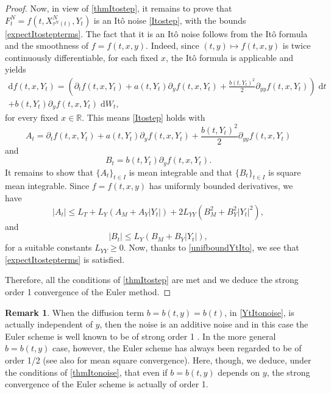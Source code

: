 \documentclass[reqno,12pt]{amsart}
\theoremstyle{plain}%
\theoremstyle{definition}
\newtheorem{rmk}{Remark}[section]
\begin{document}
\begin{proof}
    Now, in view of \cref{thmItostep}, it remains to prove that $F_t^N = f(t, X_{\tau^N(t)}^N, Y_t)$ is an It\^o noise  \eqref{Itostep}, with the bounds \eqref{expectItostepterms}. The fact that it is an It\^o noise follows from the It\^o formula and the smoothness of $f=f(t, x, y)$. Indeed, since $(t, y) \mapsto f(t, x, y)$ is twice continuously differentiable, for each fixed $x$, the It\^o formula is applicable and yields
    \begin{multline}
        \label{itoformula}
            \mathrm{d}f(t, x, Y_t) = \left(\partial_t f(t, x, Y_t) + a(t, Y_t) \partial_y f(t, x, Y_t)  + \frac{b(t, Y_t)^2}{2}\partial_{yy}f(t, x, Y_t) \right) \;\mathrm{d}t \\ + b(t, Y_t) \partial_y f(t, x, Y_t)\;\mathrm{d}W_t,
        \end{multline}
    for every fixed $x\in \mathbb{R}$. This means \eqref{Itostep} holds with
    \[
        A_t = \partial_t f(t, x, Y_t) + a(t, Y_t) \partial_y f(t, x, Y_t)  + \frac{b(t, Y_t)^2}{2}\partial_{yy}f(t, x, Y_t)
    \]
    and
    \[
        B_t = b(t, Y_t) \partial_y f(t, x, Y_t).
    \]
    It remains to show that $\{A_t\}_{t\in I}$ is mean integrable and that $\{B_t\}_{t\in I}$ is square mean integrable. Since $f=f(t, x, y)$ has uniformly bounded derivatives, we have
    \[
        |A_t| \leq L_T + L_Y(A_M + A_Y|Y_t|) + 2L_{YY}(B_M^2 + B_Y^2|Y_t|^2),
    \]
    and
    \[
        |B_t| \leq L_Y (B_M + B_Y |Y_t|),
    \]
    for a suitable constants $L_{YY}\geq 0$. Now, thanks to \eqref{unifboundYtIto}, we see that \eqref{expectItostepterms} is satisfied.

    Therefore, all the conditions of \cref{thmItostep} are met and we deduce the strong order 1 convergence of the Euler method.
\end{proof}

\begin{rmk}
    When the diffusion term $b = b(t, y) = b(t)$, in \eqref{YtItonoise}, is actually independent of $y$, then the noise is an additive noise and in this case the Euler scheme is well known to be of strong order 1 \cite{HighamKloeden2021}. In the more general $b=b(t, y)$ case, however, the Euler scheme has always been regarded to be of order 1/2 \cite{GruneKloeden2001} (see also \cite{WangCaoHanKloeden2021} for mean square convergence). Here, though, we deduce, under the conditions of \cref{thmItonoise}, that even if $b=b(t, y)$ depends on $y$, the strong convergence of the Euler scheme is actually of order 1.    
\end{rmk}
\end{document}
